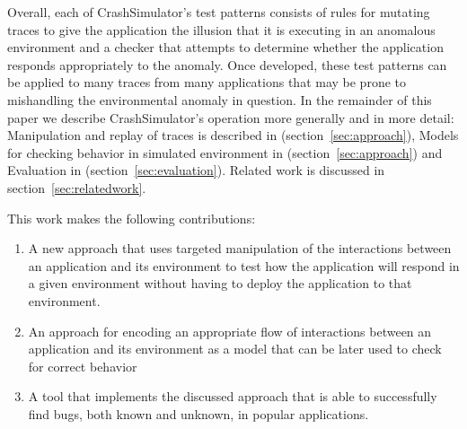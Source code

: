 Overall, each of CrashSimulator's test patterns consists of rules for
mutating traces to give the application the illusion that it is
executing in an anomalous environment and a checker that attempts to
determine whether the application responds appropriately to the
anomaly.  Once developed, these test patterns can be applied to many
traces from many applications that may be prone to mishandling the
environmental anomaly in question.  In the remainder of this paper we
describe CrashSimulator's operation more generally and in more detail:
Manipulation and replay of traces is described in
(section~\ref{sec:approach}), Models for checking behavior in
simulated environment in (section~\ref{sec:approach}) and Evaluation
in (section~\ref{sec:evaluation}).  Related work is discussed in
section~\ref{sec:relatedwork}.

This work makes the following contributions:

\begin{enumerate}
\item{A new approach that uses targeted manipulation of the
    interactions between an application and its environment to test
    how the application will respond in a given environment without
    having to deploy the application to that environment.}
\item{An approach for encoding an appropriate flow of interactions
    between an application and its environment as a model that can be
    later used to check for correct behavior}
\item{A tool that implements the discussed approach that is able to
    successfully find bugs, both known and unknown, in popular
    applications.}
\end{enumerate}


